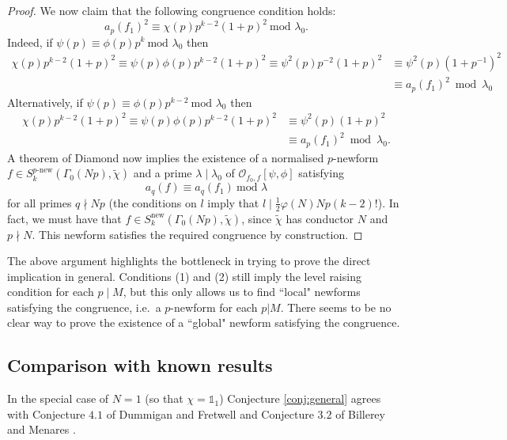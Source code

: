 \documentclass{amsart}
\theoremstyle{plain}
\theoremstyle{definition}
\begin{document}
\begin{proof}
We now claim that the following congruence condition holds:
\begin{equation}
\label{eq:diamond}
    a_p(f_1)^2 \equiv \chi(p)p^{k-2}(1+p)^2 \ \text{mod } \lambda_0.
\end{equation}
Indeed, if $\psi(p) \equiv \phi(p)p^k \ \text{mod } \lambda_0$ then
\begin{align*}
    \chi(p)p^{k-2}(1+p)^2 \equiv \psi(p)\phi(p)p^{k-2}(1+p)^2
    \equiv \psi^2(p)p^{-2}(1+p)^2
    &\equiv \psi^2(p)(1+p^{-1})^2 \\ &\equiv a_p(f_1)^2 \bmod \lambda_0
\end{align*}
Alternatively, if $\psi(p) \equiv \phi(p)p^{k-2} \ \text{mod } \lambda_0$ then
\begin{align*}
 \chi(p)p^{k-2}(1+p)^2 \equiv \psi(p)\phi(p)p^{k-2}(1+p)^2 
    &\equiv \psi^2(p)(1+p)^2 \\ &\equiv a_p(f_1)^2 \bmod  \lambda_0.
\end{align*}
A theorem of Diamond \cite[Theorem 1]{diamond_1991} now implies the existence of a normalised $p$-newform $f \in S_k^{p\text{-new}}(\Gamma_0(Np), \tilde{\chi})$ and a prime $\lambda \mid \lambda_0$ of $\mathcal{O}_{f_0,f}[\psi,\phi]$ satisfying
\begin{equation*}
    a_q(f) \equiv a_q(f_1) \ \text{mod } \lambda
\end{equation*}
for all primes $q\nmid Np$ (the conditions on $l$ imply that $l\mid\frac{1}{2}\varphi(N)Np(k-2)!$). In fact, we must have that $f\in S_k^{\text{new}}(\Gamma_0(Np),\tilde{\chi})$, since $\tilde{\chi}$ has conductor $N$ and $p\nmid N$. This newform satisfies the required congruence by construction.
\end{proof}

The above argument highlights the bottleneck in trying to prove the direct implication in general. Conditions (1) and (2) still imply the level raising condition for each $p\mid M$, but this only allows us to find ``local" newforms satisfying the congruence, i.e.\ a $p$-newform for each $p|M$. There seems to be no clear way to prove the existence of a ``global" newform satisfying the congruence.

\subsection{Comparison with known results}

In the special case of $N=1$ (so that $\chi = \mathds{1}_1$) Conjecture \ref{conj:general} agrees with Conjecture $4.1$ of Dummigan and Fretwell \cite{dummigan_fretwell_2014} and Conjecture $3.2$ of Billerey and Menares \cite{billerey_menares_2016}.
\end{document}
